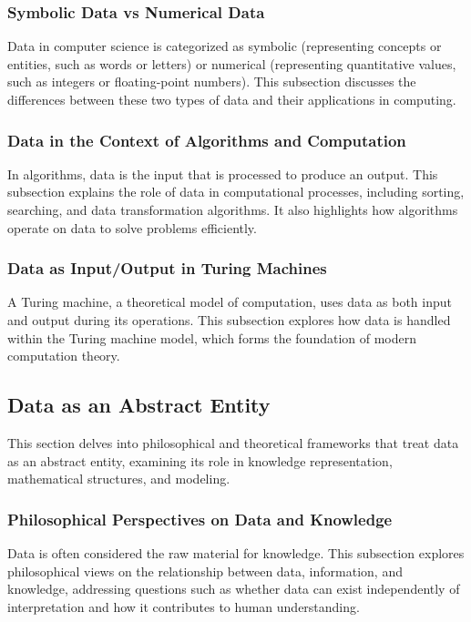 \documentclass[12pt, oneside]{book}
\begin{document}
\subsubsection{Symbolic Data vs Numerical Data}
Data in computer science is categorized as symbolic (representing concepts or entities, such as words or letters) or numerical (representing quantitative values, such as integers or floating-point numbers). This subsection discusses the differences between these two types of data and their applications in computing.

\subsubsection{Data in the Context of Algorithms and Computation}
In algorithms, data is the input that is processed to produce an output. This subsection explains the role of data in computational processes, including sorting, searching, and data transformation algorithms. It also highlights how algorithms operate on data to solve problems efficiently.

\subsubsection{Data as Input/Output in Turing Machines}
A Turing machine, a theoretical model of computation, uses data as both input and output during its operations. This subsection explores how data is handled within the Turing machine model, which forms the foundation of modern computation theory.

\subsection{Data as an Abstract Entity}
This section delves into philosophical and theoretical frameworks that treat data as an abstract entity, examining its role in knowledge representation, mathematical structures, and modeling.

\subsubsection{Philosophical Perspectives on Data and Knowledge}
Data is often considered the raw material for knowledge. This subsection explores philosophical views on the relationship between data, information, and knowledge, addressing questions such as whether data can exist independently of interpretation and how it contributes to human understanding.
\end{document}
